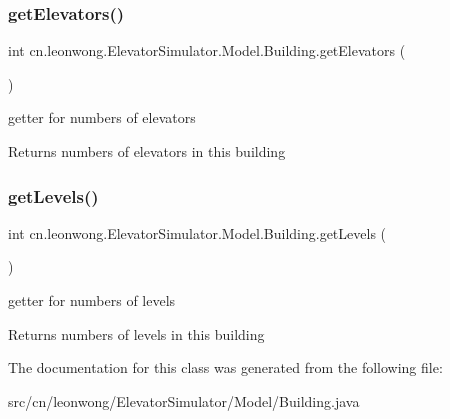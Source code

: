 \subsubsection{\texorpdfstring{get\+Elevators()}{getElevators()}}
{\footnotesize\ttfamily int cn.\+leonwong.\+Elevator\+Simulator.\+Model.\+Building.\+get\+Elevators (\begin{DoxyParamCaption}{ }\end{DoxyParamCaption})}

getter for numbers of elevators \begin{DoxyReturn}{Returns}
numbers of elevators in this building 
\end{DoxyReturn}
\mbox{\label{classcn_1_1leonwong_1_1_elevator_simulator_1_1_model_1_1_building_a140ef7ab3469607bd537c51b3da5b833}} 
\subsubsection{\texorpdfstring{get\+Levels()}{getLevels()}}
{\footnotesize\ttfamily int cn.\+leonwong.\+Elevator\+Simulator.\+Model.\+Building.\+get\+Levels (\begin{DoxyParamCaption}{ }\end{DoxyParamCaption})}

getter for numbers of levels \begin{DoxyReturn}{Returns}
numbers of levels in this building 
\end{DoxyReturn}


The documentation for this class was generated from the following file\+:\begin{DoxyCompactItemize}
\item 
src/cn/leonwong/\+Elevator\+Simulator/\+Model/Building.\+java\end{DoxyCompactItemize}
